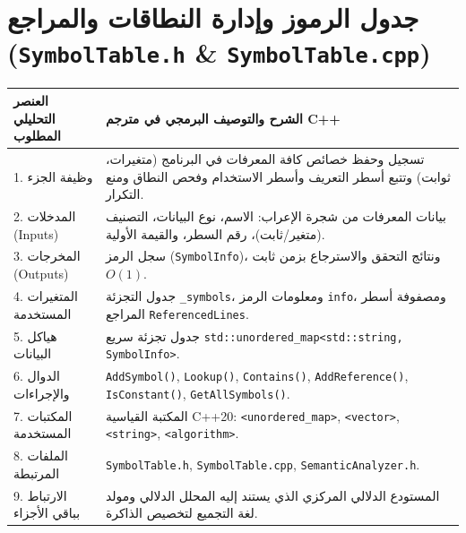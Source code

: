 \documentclass[11pt,a4paper,oneside]{report}
\begin{document}
\section{جدول الرموز وإدارة النطاقات والمراجع (\texttt{SymbolTable.h} \& \texttt{SymbolTable.cpp})}
\begin{longtable}{|p{4.2cm}|p{12.2cm}|}
\hline
\rowcolor{NavyBlue}\color{white}\textbf{\arabicfont العنصر التحليلي المطلوب} & \rowcolor{NavyBlue}\color{white}\textbf{\arabicfont الشرح والتوصيف البرمجي في مترجم C++} \\
\hline
\endhead
1. وظيفة الجزء & تسجيل وحفظ خصائص كافة المعرفات في البرنامج (متغيرات، ثوابت) وتتبع أسطر التعريف وأسطر الاستخدام وفحص النطاق ومنع التكرار. \\
\hline
2. المدخلات (Inputs) & بيانات المعرفات من شجرة الإعراب: الاسم، نوع البيانات، التصنيف (متغير/ثابت)، رقم السطر، والقيمة الأولية. \\
\hline
3. المخرجات (Outputs) & سجل الرمز (\texttt{SymbolInfo})، ونتائج التحقق والاسترجاع بزمن ثابت $O(1)$. \\
\hline
4. المتغيرات المستخدمة & جدول التجزئة \texttt{\_symbols}، ومعلومات الرمز \texttt{info}، ومصفوفة أسطر المراجع \texttt{ReferencedLines}. \\
\hline
5. هياكل البيانات & جدول تجزئة سريع \texttt{std::unordered\_map<std::string, SymbolInfo>}. \\
\hline
6. الدوال والإجراءات & \texttt{AddSymbol()}, \texttt{Lookup()}, \texttt{Contains()}, \texttt{AddReference()}, \texttt{IsConstant()}, \texttt{GetAllSymbols()}. \\
\hline
7. المكتبات المستخدمة & المكتبة القياسية C++20: \texttt{<unordered\_map>}, \texttt{<vector>}, \texttt{<string>}, \texttt{<algorithm>}. \\
\hline
8. الملفات المرتبطة & \texttt{SymbolTable.h}, \texttt{SymbolTable.cpp}, \texttt{SemanticAnalyzer.h}. \\
\hline
9. الارتباط بباقي الأجزاء & المستودع الدلالي المركزي الذي يستند إليه المحلل الدلالي ومولد لغة التجميع لتخصيص الذاكرة. \\
\hline
\end{longtable}
\end{document}
